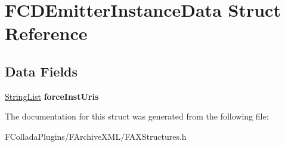 \hypertarget{structFCDEmitterInstanceData}{
\section{FCDEmitterInstanceData Struct Reference}
\label{structFCDEmitterInstanceData}
}
\subsection*{Data Fields}
\begin{DoxyCompactItemize}
\item 
\hypertarget{structFCDEmitterInstanceData_a769508e2753d8ef69301ba416e00bb41}{
\hyperlink{classfm_1_1vector}{StringList} {\bfseries forceInstUris}}
\label{structFCDEmitterInstanceData_a769508e2753d8ef69301ba416e00bb41}

\end{DoxyCompactItemize}


The documentation for this struct was generated from the following file:\begin{DoxyCompactItemize}
\item 
FColladaPlugins/FArchiveXML/FAXStructures.h\end{DoxyCompactItemize}
